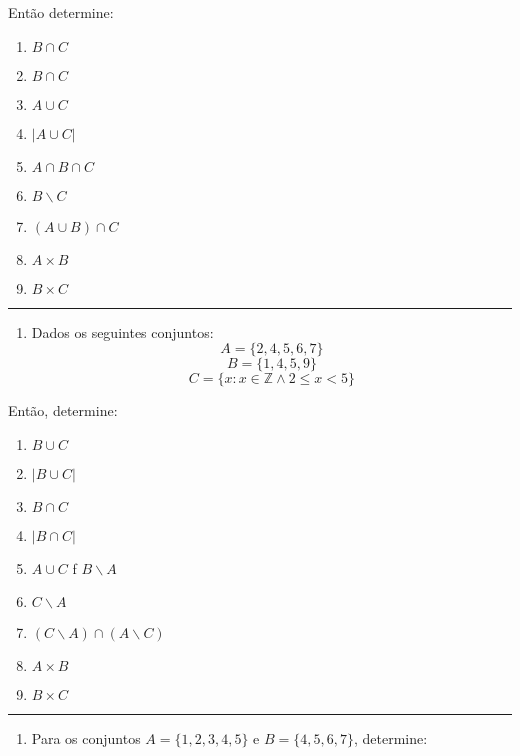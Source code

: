 Então determine:

\begin{enumerate}
\def\labelenumi{\alph{enumi}.}
\item
  \(B\cap C\)
\item
  \(B\cap C\)
\item
  \(A\cup C\)
\item
  \(|A\cup C|\)
\item
  \(A \cap B \cap C\)
\item
  \(B \backslash C\)
\item
  \((A\cup B)\cap C\)
\item
  \(A\times B\)
\item
  \(B\times C\)
\end{enumerate}

\begin{center}\rule{0.5\linewidth}{0.5pt}\end{center}

\begin{enumerate}
\def\labelenumi{\arabic{enumi}.}
\setcounter{enumi}{1}
\item
  Dados os seguintes conjuntos: \[A=\{2,4,5,6,7\}\] \[B=\{1,4,5,9\}\]
  \[C=\{x:x\in \mathbb{Z}\land 2\leq x<5\}\]
\end{enumerate}

Então, determine:

\begin{enumerate}
\def\labelenumi{\alph{enumi}.}
\item
  \(B\cup C\)
\item
  \(|B\cup C|\)
\item
  \(B\cap C\)
\item
  \(|B\cap C|\)
\item
  \(A\cup C\) f \(B\backslash A\)
\item
  \(C\backslash A\)
\item
  \((C\backslash A)\cap (A\backslash C)\)
\item
  \(A\times B\)
\item
  \(B\times C\)
\end{enumerate}

\begin{center}\rule{0.5\linewidth}{0.5pt}\end{center}

\begin{enumerate}
\def\labelenumi{\arabic{enumi}.}
\setcounter{enumi}{2}
\item
  Para os conjuntos \(A=\{1,2,3,4,5\}\) e \(B=\{4,5,6,7\}\), determine:
\end{enumerate}

